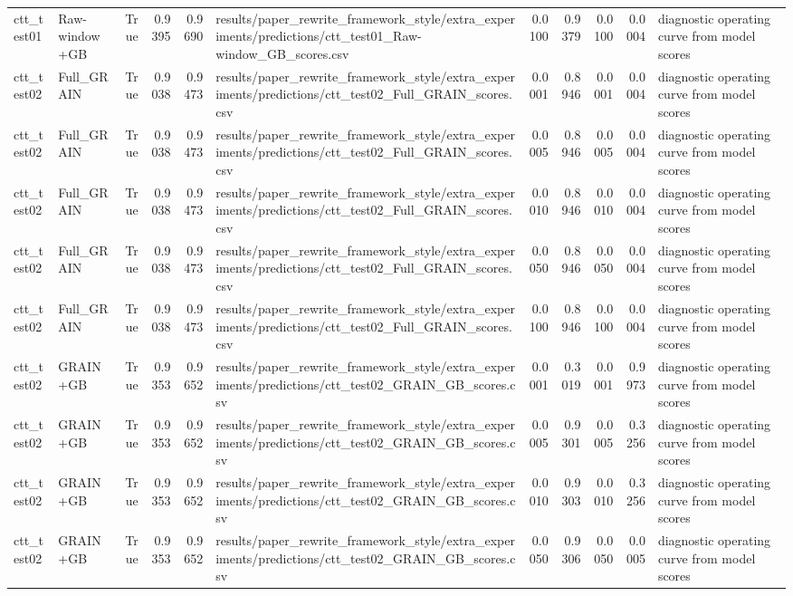 \begin{tabular}{llrrrlrrrrl}
ctt\_test01 & Raw-window+GB & True & 0.9395 & 0.9690 & results/paper\_rewrite\_framework\_style/extra\_experiments/predictions/ctt\_test01\_Raw-window\_GB\_scores.csv & 0.0100 & 0.9379 & 0.0100 & 0.0004 & diagnostic operating curve from model scores \\
ctt\_test02 & Full\_GRAIN & True & 0.9038 & 0.9473 & results/paper\_rewrite\_framework\_style/extra\_experiments/predictions/ctt\_test02\_Full\_GRAIN\_scores.csv & 0.0001 & 0.8946 & 0.0001 & 0.0004 & diagnostic operating curve from model scores \\
ctt\_test02 & Full\_GRAIN & True & 0.9038 & 0.9473 & results/paper\_rewrite\_framework\_style/extra\_experiments/predictions/ctt\_test02\_Full\_GRAIN\_scores.csv & 0.0005 & 0.8946 & 0.0005 & 0.0004 & diagnostic operating curve from model scores \\
ctt\_test02 & Full\_GRAIN & True & 0.9038 & 0.9473 & results/paper\_rewrite\_framework\_style/extra\_experiments/predictions/ctt\_test02\_Full\_GRAIN\_scores.csv & 0.0010 & 0.8946 & 0.0010 & 0.0004 & diagnostic operating curve from model scores \\
ctt\_test02 & Full\_GRAIN & True & 0.9038 & 0.9473 & results/paper\_rewrite\_framework\_style/extra\_experiments/predictions/ctt\_test02\_Full\_GRAIN\_scores.csv & 0.0050 & 0.8946 & 0.0050 & 0.0004 & diagnostic operating curve from model scores \\
ctt\_test02 & Full\_GRAIN & True & 0.9038 & 0.9473 & results/paper\_rewrite\_framework\_style/extra\_experiments/predictions/ctt\_test02\_Full\_GRAIN\_scores.csv & 0.0100 & 0.8946 & 0.0100 & 0.0004 & diagnostic operating curve from model scores \\
ctt\_test02 & GRAIN+GB & True & 0.9353 & 0.9652 & results/paper\_rewrite\_framework\_style/extra\_experiments/predictions/ctt\_test02\_GRAIN\_GB\_scores.csv & 0.0001 & 0.3019 & 0.0001 & 0.9973 & diagnostic operating curve from model scores \\
ctt\_test02 & GRAIN+GB & True & 0.9353 & 0.9652 & results/paper\_rewrite\_framework\_style/extra\_experiments/predictions/ctt\_test02\_GRAIN\_GB\_scores.csv & 0.0005 & 0.9301 & 0.0005 & 0.3256 & diagnostic operating curve from model scores \\
ctt\_test02 & GRAIN+GB & True & 0.9353 & 0.9652 & results/paper\_rewrite\_framework\_style/extra\_experiments/predictions/ctt\_test02\_GRAIN\_GB\_scores.csv & 0.0010 & 0.9303 & 0.0010 & 0.3256 & diagnostic operating curve from model scores \\
ctt\_test02 & GRAIN+GB & True & 0.9353 & 0.9652 & results/paper\_rewrite\_framework\_style/extra\_experiments/predictions/ctt\_test02\_GRAIN\_GB\_scores.csv & 0.0050 & 0.9306 & 0.0050 & 0.0005 & diagnostic operating curve from model scores \\

\end{tabular}
